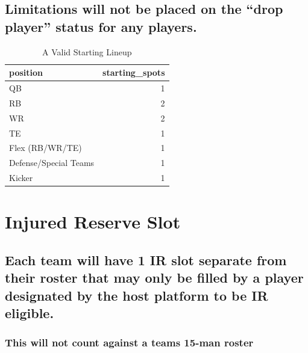 \documentclass[]{book}
\begin{document}
\hypertarget{limitations-will-not-be-placed-on-the-drop-player-status-for-any-players.}{%
\subsection{Limitations will not be placed on the ``drop player'' status for any players.}\label{limitations-will-not-be-placed-on-the-drop-player-status-for-any-players.}}

\begin{table}[t]

\caption{\label{tab:unnamed-chunk-9}A Valid Starting Lineup}
\centering
\begin{tabular}{lr}
\toprule
position & starting\_spots\\
\midrule
QB & 1\\
RB & 2\\
WR & 2\\
TE & 1\\
Flex (RB/WR/TE) & 1\\
\addlinespace
Defense/Special Teams & 1\\
Kicker & 1\\
\bottomrule
\end{tabular}
\end{table}

\hypertarget{injured-reserve-slot}{%
\section{Injured Reserve Slot}\label{injured-reserve-slot}}

\hypertarget{each-team-will-have-1-ir-slot-separate-from-their-roster-that-may-only-be-filled-by-a-player-designated-by-the-host-platform-to-be-ir-eligible.}{%
\subsection{Each team will have 1 IR slot separate from their roster that may only be filled by a player designated by the host platform to be IR eligible.}\label{each-team-will-have-1-ir-slot-separate-from-their-roster-that-may-only-be-filled-by-a-player-designated-by-the-host-platform-to-be-ir-eligible.}}

\hypertarget{this-will-not-count-against-a-teams-15-man-roster}{%
\subsubsection{This will not count against a teams 15-man roster}\label{this-will-not-count-against-a-teams-15-man-roster}}
\end{document}
